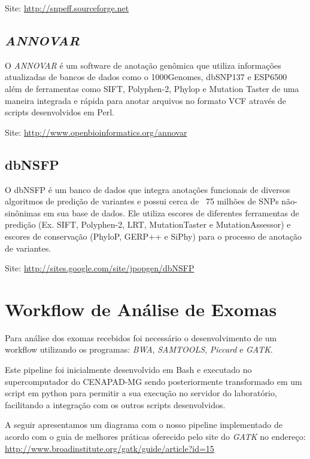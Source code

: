 \noindent
Site: \url{http://snpeff.sourceforge.net}

\subsection{\textit{ANNOVAR}}

O \textit{ANNOVAR} \cite{Wang2010} é um software de anotação genômica que utiliza informações atualizadas de bancos de dados como o 1000Genomes, dbSNP137 e ESP6500 além de ferramentas como SIFT, Polyphen-2, Phylop e Mutation Taster de uma maneira integrada e rápida  para anotar arquivos no formato VCF através de scripts desenvolvidos em Perl.

\noindent
Site: \url{http://www.openbioinformatics.org/annovar}


\subsection{dbNSFP}

O dbNSFP \cite{Liu2011b} é um banco de dados que integra anotações funcionais de diversos algoritmos de predição de variantes e possui cerca de ~75 milhões de SNPs não-sinônimas em sua base de dados. Ele utiliza escores de diferentes ferramentas de predição (Ex. SIFT, Polyphen-2, LRT, MutationTaster e MutationAssessor) e escores de conservação (PhyloP, GERP++ e SiPhy) para o processo de anotação de variantes.

\noindent
Site: \url{http://sites.google.com/site/jpopgen/dbNSFP}

\section{Workflow de Análise de Exomas}

Para análise dos exomas recebidos foi necessário o desenvolvimento de um workflow utilizando os programas: \textit{BWA}, \textit{SAMTOOLS}, \textit{Piccard} e \textit{GATK}.

Este pipeline foi inicialmente desenvolvido em Bash e executado no supercomputador do CENAPAD-MG sendo posteriormente transformado em um script em python para permitir a sua execução no servidor do laboratório, facilitando a integração com os outros scripts desenvolvidos.

A seguir apresentamos um diagrama com o nosso pipeline implementado de acordo com o guia de melhores práticas oferecido pelo site do \textit{GATK} no endereço: \url{http://www.broadinstitute.org/gatk/guide/article?id=15}

